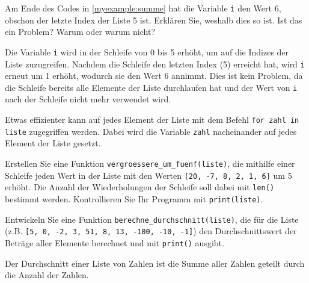 \begin{myexercise}
	Am Ende des Codes in \cref{myexample:summe} hat die Variable \lstinline|i| den Wert 6, obschon der letzte Index der Liste 5 ist. Erklären Sie, weshalb dies so ist. Ist das ein Problem? Warum oder warum nicht?
	\begin{myanswer}
		Die Variable \lstinline|i| wird in der Schleife von 0 bis 5 erhöht, um auf die Indizes der Liste zuzugreifen. Nachdem die Schleife den letzten Index (5) erreicht hat, wird \lstinline|i| erneut um 1 erhöht, wodurch sie den Wert 6 annimmt. Dies ist kein Problem, da die Schleife bereits alle Elemente der Liste durchlaufen hat und der Wert von \lstinline|i| nach der Schleife nicht mehr verwendet wird.
	\end{myanswer}
\end{myexercise}

\begin{myexample}
	Etwas effizienter kann auf jedes Element der Liste mit dem Befehl \lstinline|for zahl in liste| zugegriffen werden. Dabei wird die Variable \lstinline|zahl| nacheinander auf jedes Element der Liste gesetzt.
	
\end{myexample}

\begin{myexercise}
	Erstellen Sie eine Funktion \lstinline|vergroessere_um_fuenf(liste)|, die mithilfe einer Schleife jeden Wert in der Liste mit den Werten \lstinline|[20, -7, 8, 2, 1, 6]| um 5 erhöht. Die Anzahl der Wiederholungen der Schleife soll dabei mit \lstinline|len()| bestimmt werden. Kontrollieren Sie Ihr Programm mit \lstinline|print(liste)|.

	\begin{myanswer}
		
	\end{myanswer}
\end{myexercise}



\begin{myexercise}
	Entwickeln Sie eine Funktion \lstinline|berechne_durchschnitt(liste)|, die für die Liste (z.B. \lstinline|[5, 0, -2, 3, 51, 8, 13, -100, -10, -1]|) den Durchschnittswert der Beträge aller Elemente berechnet und mit \lstinline|print()| ausgibt.

	Der Durchschnitt einer Liste von Zahlen ist die Summe aller Zahlen geteilt durch die Anzahl der Zahlen.
	\begin{myanswer}
		
	\end{myanswer}
\end{myexercise}

